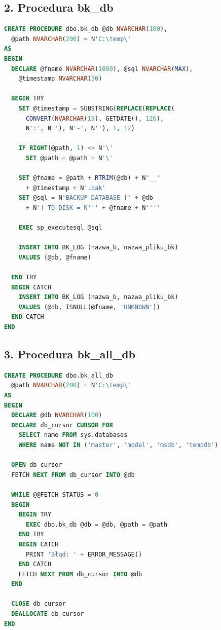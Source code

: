 \documentclass[a4paper,10pt]{article}
\begin{document}
	\subsection{2. Procedura bk\_db}
	\begin{lstlisting}[language=SQL]
CREATE PROCEDURE dbo.bk_db @db NVARCHAR(100), 
  @path NVARCHAR(200) = N'C:\temp\'
AS
BEGIN
  DECLARE @fname NVARCHAR(1000), @sql NVARCHAR(MAX),
    @timestamp NVARCHAR(50)
  
  BEGIN TRY
    SET @timestamp = SUBSTRING(REPLACE(REPLACE(
      CONVERT(NVARCHAR(19), GETDATE(), 126), 
      N':', N''), N'-', N''), 1, 12)
    
    IF RIGHT(@path, 1) <> N'\'
      SET @path = @path + N'\'
    
    SET @fname = @path + RTRIM(@db) + N'__' 
      + @timestamp + N'.bak'
    SET @sql = N'BACKUP DATABASE [' + @db 
      + N'] TO DISK = N''' + @fname + N''''
    
    EXEC sp_executesql @sql
    
    INSERT INTO BK_LOG (nazwa_b, nazwa_pliku_bk)
    VALUES (@db, @fname)
    
  END TRY
  BEGIN CATCH
    INSERT INTO BK_LOG (nazwa_b, nazwa_pliku_bk)
    VALUES (@db, ISNULL(@fname, 'UNKNOWN'))
  END CATCH
END
	\end{lstlisting}
	
	\subsection{3. Procedura bk\_all\_db}
	\begin{lstlisting}[language=SQL]
CREATE PROCEDURE dbo.bk_all_db 
  @path NVARCHAR(200) = N'C:\temp\'
AS
BEGIN
  DECLARE @db NVARCHAR(100)
  DECLARE db_cursor CURSOR FOR
    SELECT name FROM sys.databases 
    WHERE name NOT IN ('master', 'model', 'msdb', 'tempdb')
  
  OPEN db_cursor
  FETCH NEXT FROM db_cursor INTO @db
  
  WHILE @@FETCH_STATUS = 0
  BEGIN
    BEGIN TRY
      EXEC dbo.bk_db @db = @db, @path = @path
    END TRY
    BEGIN CATCH
      PRINT 'Błąd: ' + ERROR_MESSAGE()
    END CATCH
    FETCH NEXT FROM db_cursor INTO @db
  END
  
  CLOSE db_cursor
  DEALLOCATE db_cursor
END
	\end{lstlisting}
	
\end{document}
